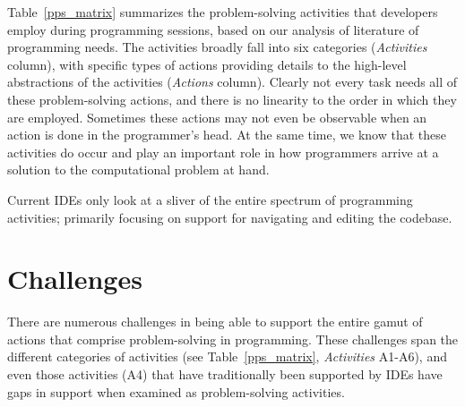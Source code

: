 \documentclass{ppig}
\begin{document}


Table~\ref{pps_matrix} summarizes the problem-solving activities that developers employ during programming sessions, based on our analysis of literature of programming needs.
The activities broadly fall into six categories (\textit{Activities} column), with specific types of actions providing details to the high-level abstractions of the activities (\textit{Actions} column).
Clearly not every task needs all of these problem-solving actions, and there is no linearity to the order in which they are employed.
Sometimes these actions may not even be observable when an action is done in the programmer's head.
At the same time, we know that these activities do occur and play an important role in how programmers arrive at a solution to the computational problem at hand.

Current IDEs only look at a sliver of the entire spectrum of programming activities; primarily focusing on support for navigating and editing the codebase.

\section{Challenges}

There are numerous challenges in being able to support the entire gamut of actions that comprise problem-solving in programming.
These challenges span the different categories of activities (see Table~\ref{pps_matrix}, \textit{Activities} A1-A6), and even those activities (A4) that have traditionally been supported by IDEs have gaps in support when examined as problem-solving activities.
\end{document}
